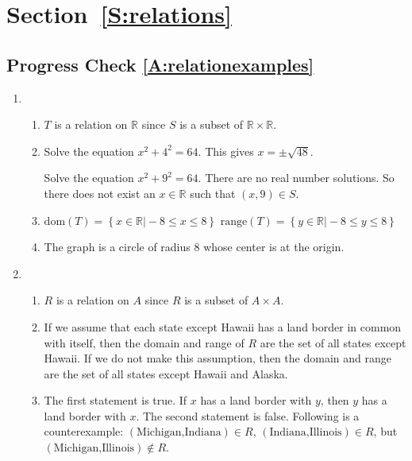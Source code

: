 \section*{Section~\ref{S:relations}}

\subsection*{Progress Check \ref{A:relationexamples}}
\begin{enumerate}
\item %

\begin{enumerate}
\item $T$  is a relation on  $\mathbb{R}$ since  $S$  is a subset of  
$\mathbb{R} \times \mathbb{R}$.

\item Solve the equation  $x^2  + 4^2  = 64$.  This gives  $x =  \pm \sqrt {48} $.

Solve the equation  $x^2  + 9^2  = 64$.  There are no real number solutions.  So there does not exist an  $x \in \mathbb{R}$ such that  $\left( {x, 9} \right) \in S$.

\item $\text{dom}( T ) = \left\{ {\left. {x \in \mathbb{R} } \right|  - 8 \leq x \leq 8} \right\}$ \qquad
$\text{range}( T ) = \left\{ {\left. {y \in \mathbb{R} } \right|  - 8 \leq y \leq 8} \right\}$

\item The graph is a circle of radius 8 whose center is at the origin.
\end{enumerate}

\item \begin{enumerate}
\item $R$  is a relation on  $A$  since  $R$  is a subset of  $A \times A$.

\item If we assume that each state except Hawaii has a land border in common with itself, then the domain and range of  $R$  are the set of all states except Hawaii.  If we do not make this assumption, then the domain and range are the set of all states except Hawaii and Alaska.

\item The first statement is true.  If  $x$  has a land border with  $y$, then  $y$  has a land border with  $x$.  The second statement is false.  Following is a counterexample:    
$\left( {\text{Michigan,} \text{Indiana}} \right) \in R$,  %
$\left( {\text{Indiana,Illinois}} \right) \in R$, but 
$\left( {\text{Michigan,} \text{Illinois}} \right) \notin R$.
\end{enumerate}
\end{enumerate}


